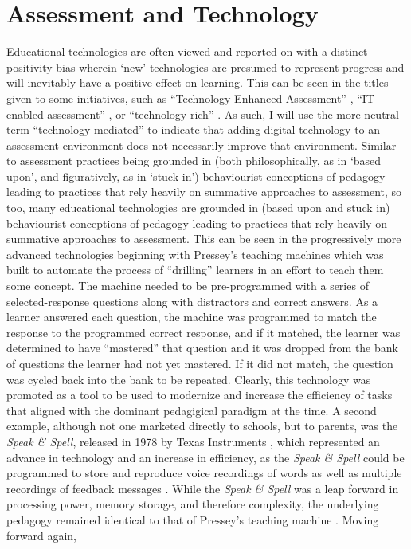 \documentclass[
]{book}
\begin{document}
\hypertarget{assessment-and-technology}{%
\section*{Assessment and Technology}\label{assessment-and-technology}}

Educational technologies are often viewed and reported on with a distinct positivity bias \citep{irvineLandscapeMergingModalities2020} wherein `new' technologies are presumed to represent progress and will inevitably have a positive effect on learning. This can be seen in the titles given to some initiatives, such as ``Technology-Enhanced Assessment'' \citep{oldfieldAssessmentDigitalAge2012, timmisRethinkingAssessmentDigital2016}, ``IT-enabled assessment'' \citep{webbAssessmentTwentyFirstCentury2018}, or ``technology-rich'' \citep{linAssessingLearningTechnologyrich2020}. As such, I will use the more neutral term ``technology-mediated'' to indicate that adding digital technology to an assessment environment does not necessarily improve that environment. Similar to assessment practices being grounded in (both philosophically, as in `based upon', and figuratively, as in `stuck in') behaviourist conceptions of pedagogy leading to practices that rely heavily on summative approaches to assessment, so too, many educational technologies are grounded in (based upon and stuck in) behaviourist conceptions of pedagogy leading to practices that rely heavily on summative approaches to assessment. This can be seen in the progressively more advanced technologies beginning with Pressey's teaching machines \citep{benjaminHistoryTeachingMachines1988, presseyMachineAutomaticTeaching1927, wattersTeachingMachinesHistory2021} which was built to automate the process of ``drilling'' learners in an effort to teach them some concept. The machine needed to be pre-programmed with a series of selected-response questions along with distractors and correct answers. As a learner answered each question, the machine was programmed to match the response to the programmed correct response, and if it matched, the learner was determined to have ``mastered'' that question and it was dropped from the bank of questions the learner had not yet mastered. If it did not match, the question was cycled back into the bank to be repeated. Clearly, this technology was promoted as a tool to be used to modernize and increase the efficiency of tasks that aligned with the dominant pedagigical paradigm at the time. A second example, although not one marketed directly to schools, but to parents, was the \emph{Speak \& Spell}, released in 1978 by Texas Instruments \citep{braguinskiArchiveCommunicationInteractive2018, frantzSpeakSpell2014}, which represented an advance in technology and an increase in efficiency, as the \emph{Speak \& Spell} could be programmed to store and reproduce voice recordings of words as well as multiple recordings of feedback messages \citep{frantzSpeakSpell2014}. While the \emph{Speak \& Spell} was a leap forward in processing power, memory storage, and therefore complexity, the underlying pedagogy remained identical to that of Pressey's teaching machine \citep{wattersSpeakSpellHistory2015}. Moving forward again, 
\end{document}
